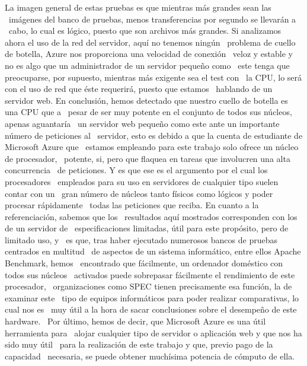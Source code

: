 \documentclass[11pt,twoside,a4paper]{book}
\begin{document}
La imagen general de estas pruebas es que mientras más grandes sean las \
imágenes del banco de pruebas, menos transferencias por segundo se llevarán a \
cabo, lo cual es lógico, puesto que son archivos más grandes. \newline
Si analizamos ahora el uso de la red del servidor, aquí no tenemos ningún \
problema de cuello de botella, Azure nos proporciona una velocidad de conexión \
veloz y estable y no es algo que un administrador de un servidor pequeño como \
este tenga que preocuparse, por supuesto, mientras más exigente sea el test con \
la CPU, lo será con el uso de red que éste requerirá, puesto que estamos \
hablando de un servidor web. \newline \newline
En conclusión, hemos detectado que nuestro cuello de botella es una CPU que a \
pesar de ser muy potente en el conjunto de todos sus núcleos, apenas aguantaría \
un servidor web pequeño como este ante un importante número de peticiones al \
servidor, esto es debido a que la cuenta de estudiante de Microsoft Azure que \
estamos empleando para este trabajo solo ofrece un núcleo de procesador, \
potente, si, pero que flaquea en tareas que involucren una alta concurrencia \
de peticiones. Y es que ese es el argumento por el cual los procesadores \
empleados para su uso en servidores de cualquier tipo suelen contar con un \
gran número de núcleos tanto físicos como lógicos y poder procesar rápidamente \
todas las peticiones que reciba. En cuanto a la referenciación, sabemos que los \
resultados aquí mostrados corresponden con los de un servidor de \
especificaciones limitadas, útil para este propósito, pero de limitado uso, y \
es que, tras haber ejecutado numerosos bancos de pruebas centrados en multitud \
de aspectos de un sistema informático, entre ellos Apache Benchmark, hemos \
encontrado que fácilmente, un ordenador doméstico con todos sus núcleos \
activados puede sobrepasar fácilmente el rendimiento de este procesador, \
organizaciones como SPEC tienen precisamente esa función, la de examinar este \
tipo de equipos informáticos para poder realizar comparativas, lo cual nos es \
muy útil a la hora de sacar conclusiones sobre el desempeño de este hardware. \
Por último, hemos de decir, que Microsoft Azure es una útil herramienta para \
alojar cualquier tipo de servidor o aplicación web y que nos ha sido muy útil \
para la realización de este trabajo y que, previo pago de la capacidad \
necesaria, se puede obtener muchísima potencia de cómputo de ella.
\end{document}
